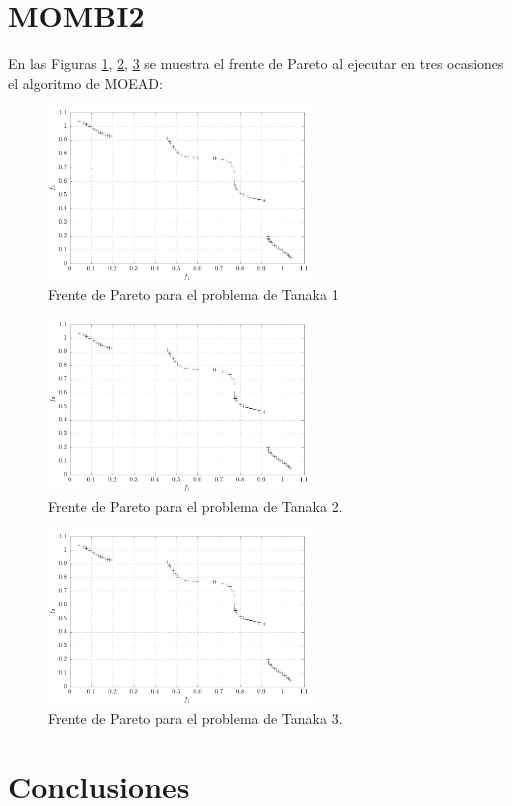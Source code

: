 \documentclass[conference]{IEEEtran}
\begin{document}
\section{MOMBI2}
En las Figuras \ref{fig:1tanaka1}, \ref{fig:1tanaka2}, \ref{fig:1tanaka3} se muestra el frente de Pareto al ejecutar en tres ocasiones el algoritmo de MOEAD:
\begin{figure}[hbtp]
\centering
\includegraphics[width=7cm]{MOM1.pdf}
\caption{Frente de Pareto para el problema de Tanaka 1}
\label{fig:1tanaka1}
\end{figure}

\begin{figure}[hbtp]
\centering
\includegraphics[width=7cm]{MOM2.pdf}
\caption{Frente de Pareto para el problema de Tanaka  2.}
\label{fig:1tanaka2}
\end{figure}

\begin{figure}[hbtp]
\centering
\includegraphics[width=7cm]{MOM3.pdf}
\caption{Frente de Pareto para el problema de Tanaka 3.}
\label{fig:1tanaka3}
\end{figure}

\section{Conclusiones}
\end{document}
